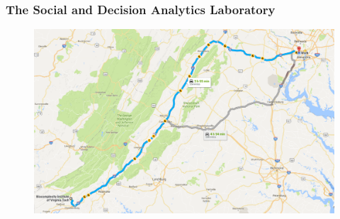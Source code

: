 \documentclass[compress]{beamer}
\begin{document}
	\begin{frame}[Basic2] \frametitle{The Social and Decision Analytics Laboratory}
		\begin{figure}
			\centering
			\includegraphics[height=0.75\textheight]{../figures/sdal_google_maps}
			\label{fig:sdalgooglemaps}
		\end{figure}
	\end{frame}
\end{document}

